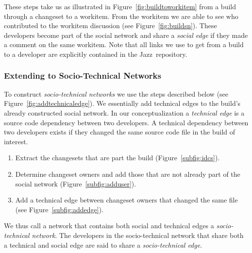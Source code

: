 \documentclass{sig-alternate}
\begin{document}
These steps take us as illustrated in Figure~\ref{fig:buildtoworkitem}
from a build through a changeset to a workitem. From the workitem we are able to
see who contributed to the workitem discussion (see Figure~\ref{fig:buildsn}).
These developers become part of the social network and
share a \emph{social edge} if they made a comment on the same workitem.
Note that all links we use to get from a build to a developer are explicitly contained in
the Jazz\texttrademark\ repository.




\subsubsection{Extending to Socio-Technical Networks}
To construct \emph{socio-technical networks} we use the steps described below
(see Figure~\ref{fig:addtechnicaledge}). We essentially add technical edges to
the build's already constructed social network. In our conceptualization a \emph{technical edge} is a source code
dependency between two developers. A technical dependency between two developers
exists if they changed the same source code file in the build of interest. 

\begin{enumerate}
\item Extract the changesets that are part the build (Figure~\ref{subfig:idcs}).
\item Determine changeset owners and add those  that are not already part
of the social network (Figure~\ref{subfig:adduser}).
\item Add a technical edge between changeset owners that changed the same file (see Figure~\ref{subfig:addedge}).
\end{enumerate}

We thus call a network that contains both social and technical edges a
\emph{socio-technical network}. The developers in the 
socio-technical network that share both a technical and social edge are said to share
a \emph{socio-technical edge}.

\end{document}
